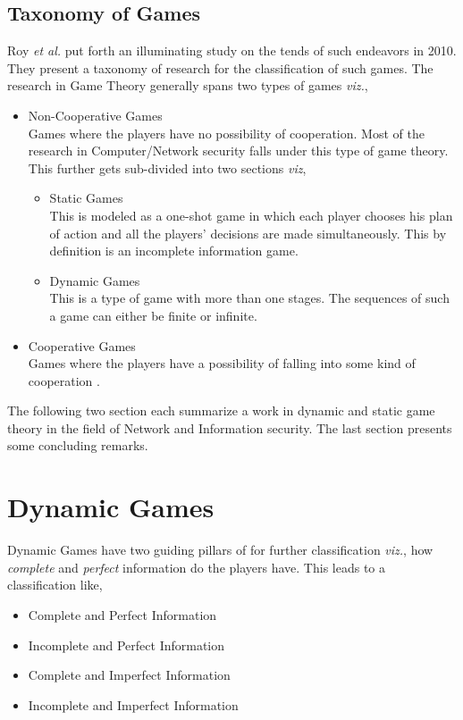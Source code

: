 \documentclass[conference]{IEEEtran}
\begin{document}
\subsection*{Taxonomy of Games}
Roy \textit{et al.}\cite{survey} put forth an illuminating study on the tends of such endeavors in 2010.
They present a taxonomy of research for the classification of such games.
The research in Game Theory generally spans two types of games \textit{viz.},
\begin{itemize}
    \item{Non-Cooperative Games}\\
        Games where the players have no possibility of cooperation.
        Most of the research in Computer/Network security falls under this type of game theory.
        This further gets sub-divided into two sections \textit{viz},
        \begin{itemize}
            \item{Static Games}\\
            This is modeled as a one-shot game in which each player chooses his plan of action and all the players' decisions are made simultaneously.
            This by definition is an incomplete information game.
            \item{Dynamic Games}\\
            This is a type of game with more than one stages.
            The sequences of such a game can either be finite or infinite.
        \end{itemize}
    \item{Cooperative Games}\\
        Games where the players have a possibility of falling into some kind of cooperation \cite{wiki-coop}.
\end{itemize}

The following two section each summarize a work in dynamic and static game theory in the field of Network and Information security.
The last section presents some concluding remarks.

\section*{Dynamic Games}
Dynamic Games have two guiding pillars of for further classification \textit{viz.}, how \textit{complete} and \textit{perfect} information do the players have.
This leads to a classification like,
\begin{itemize}
    \item Complete and Perfect Information
    \item Incomplete and Perfect Information
    \item Complete and Imperfect Information
    \item Incomplete and Imperfect Information
\end{itemize}
\end{document}

